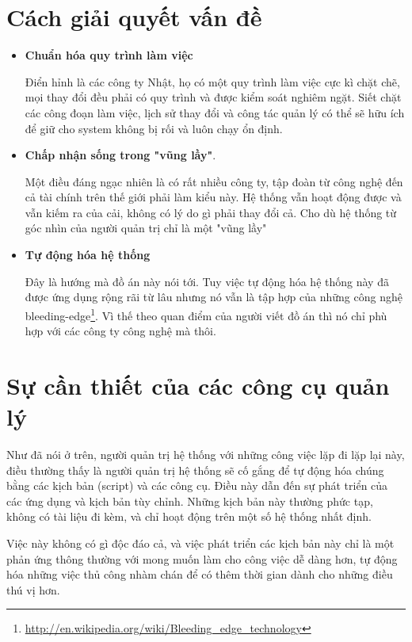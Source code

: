 \section{Cách giải quyết vấn đề}
\begin{itemize}
\item \textbf{Chuẩn hóa quy trình làm việc}

Điển hỉnh là các công ty Nhật, họ có một quy trình làm việc cực kì chặt chẽ, mọi thay đổi đều phải có quy trình và được kiểm soát nghiêm ngặt. Siết chặt các công đoạn làm việc, lịch sử thay đổi và công tác quản lý có thể sẽ hữu ích để giữ cho system không bị rối và luôn chạy ổn định.

\item \textbf{Chấp nhận sống trong "vũng lầy"}. 

Một điều đáng ngạc nhiên là có rất nhiều công ty, tập đoàn từ công nghệ đến cả tài chính trên thế giới phải làm kiểu này. Hệ thống vẫn hoạt động được và vẫn kiếm ra của cải, không có lý do gì phải thay đổi cả. Cho dù hệ thống từ góc nhìn của người quản trị chỉ là một "vũng lầy"

\item \textbf{Tự động hóa hệ thống}

Đây là hướng mà đồ án này nói tới. Tuy việc tự động hóa hệ thống này đã được ứng dụng rộng rãi từ lâu nhưng nó vẫn là tập hợp của những công nghệ bleeding-edge\footnote{\url{http://en.wikipedia.org/wiki/Bleeding_edge_technology}}. Vì thế theo quan điểm của người viết đồ án thì nó chỉ phù hợp với các công ty công nghệ mà thôi.

\end{itemize}

\newpage
\section{Sự cần thiết của các công cụ quản lý}

Như đã nói ở trên, người quản trị hệ thống với những công việc lặp đi lặp lại này, điều thường thấy là người quản trị hệ thống sẽ cố gắng để tự động hóa chúng bằng các kịch bản (script) và các công cụ. Điều này dẫn đến sự phát triển của các ứng dụng và kịch bản tùy chỉnh. Những kịch bản này thường phức tạp, không có tài liệu đi kèm, và chỉ hoạt động trên một số hệ thống nhất định.

Việc này không có gì độc đáo cả, và việc phát triển các kịch bản này chỉ là một phản ứng thông thường với mong muốn làm cho công việc dễ dàng hơn, tự động hóa những việc thủ công nhàm chán để có thêm thời gian dành cho những điều thú vị hơn.

